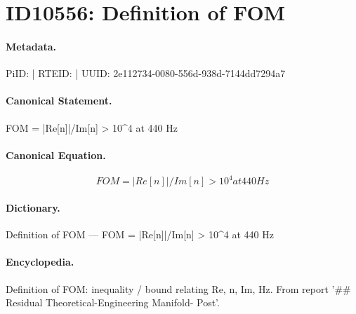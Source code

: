 \section*{ID10556: Definition of FOM}
\paragraph{Metadata.}
PiID:  | RTEID:  | UUID: 2e112734-0080-556d-938d-7144dd7294a7

\paragraph{Canonical Statement.}
FOM = |Re[n]|/Im[n] > 10\textasciicircum{}4 at 440 Hz

\paragraph{Canonical Equation.}
\[
FOM = |Re[n]|/Im[n] > 10^4 at 440 Hz
\]

\paragraph{Dictionary.}
Definition of FOM — FOM = |Re[n]|/Im[n] > 10\textasciicircum{}4 at 440 Hz

\paragraph{Encyclopedia.}
Definition of FOM: inequality / bound relating Re, n, Im, Hz. From report '\#\# Residual Theoretical-Engineering Manifold- Post'.
